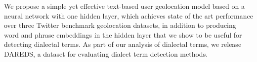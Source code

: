 We propose a simple yet effective text-based user geolocation model based on a neural network with one hidden layer, which achieves state of the art performance over three Twitter benchmark geolocation datasets, in addition to producing word                                and phrase embeddings in the hidden layer that we show to be useful for detecting dialectal terms. As part of our analysis of dialectal terms, we release DAREDS, a dataset for evaluating dialect term detection methods.
